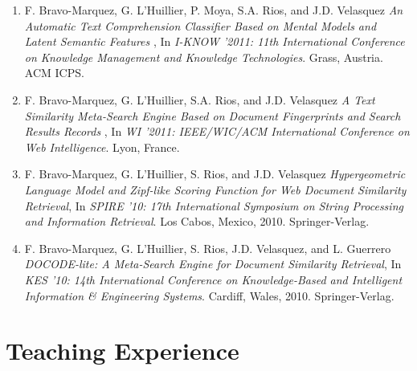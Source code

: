 \documentclass[letterpaper]{article}
\begin{document}
\begin{enumerate}
\item F. Bravo-Marquez, G. L'Huillier, P. Moya, S.A. Rios, and J.D. Velasquez  \textit{An Automatic Text Comprehension Classifier Based on Mental Models and Latent Semantic Features} , In \textit{I-KNOW '2011: 11th International Conference on Knowledge Management and Knowledge Technologies}. Grass, Austria. ACM ICPS.

\item F. Bravo-Marquez, G. L'Huillier, S.A. Rios, and J.D. Velasquez \textit{A Text Similarity Meta-Search Engine Based on Document Fingerprints and Search Results Records} , In \textit{WI '2011: IEEE/WIC/ACM International Conference on Web Intelligence}. Lyon, France. 

\item F. Bravo-Marquez, G. L'Huillier, S. Rios, and J.D. Velasquez  \textit{Hypergeometric Language Model and Zipf-like Scoring Function for Web Document Similarity Retrieval}, In \textit{SPIRE '10: 17th International Symposium on String Processing and Information Retrieval}. Los Cabos, Mexico, 2010. Springer-Verlag.

\item F. Bravo-Marquez, G. L'Huillier, S. Rios, J.D. Velasquez, and L. Guerrero  \textit{DOCODE-lite: A Meta-Search Engine for Document Similarity Retrieval}, In \textit{KES '10: 14th International Conference on Knowledge-Based and Intelligent Information \& Engineering Systems}. Cardiff, Wales, 2010. Springer-Verlag.

\end{enumerate}



\section{Teaching Experience}
\end{document}
